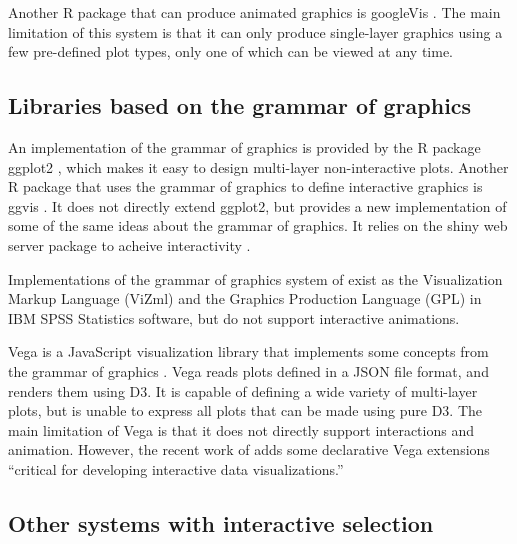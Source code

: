 \documentclass[journal]{vgtc}\usepackage[]{graphicx}\usepackage[]{color}
\begin{document}
Another R package that can produce animated graphics is googleVis
\citep{googleVis}. The main limitation of this system is that it can
only produce single-layer graphics using a few pre-defined plot types,
only one of which can be viewed at any time.

\subsection{Libraries based on the grammar of graphics}

An implementation of the grammar of graphics \citep{wilkinson} is
provided by the R package ggplot2 \citep{ggplot2-book}, which makes it
easy to design multi-layer non-interactive plots. Another R package
that uses the grammar of graphics to define interactive graphics is
ggvis \citep{ggvis}. It does not directly extend ggplot2, but provides
a new implementation of some of the same ideas about the grammar of
graphics. It relies on the shiny web server package to acheive
interactivity \citep{shiny}.

Implementations of the grammar of graphics system of
\citet{wilkinson} exist as the Visualization Markup Language (ViZml)
and the Graphics Production Language (GPL) in IBM SPSS Statistics
software, but do not support interactive animations.

Vega is a JavaScript visualization library that implements some
concepts from the grammar of graphics \citep{vega}. Vega reads plots
defined in a JSON file format, and renders them using D3. It is
capable of defining a wide variety of multi-layer plots, but is unable
to express all plots that can be made using pure D3. The main
limitation of Vega is that it does not directly support
interactions and animation. However, the recent work of
\citet{2014-reactive-vega} adds some declarative Vega extensions
``critical for developing interactive data visualizations.''

\subsection{Other systems with interactive selection}
\end{document}
